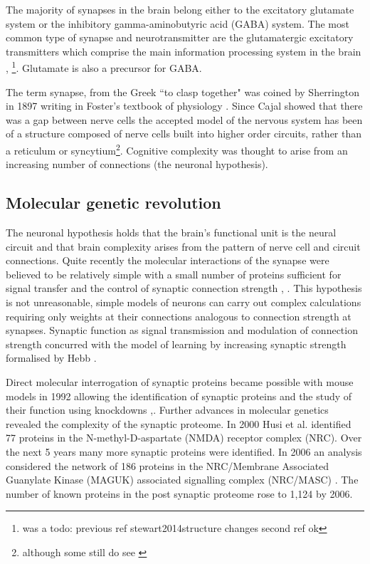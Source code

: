  The majority of synapses in the brain belong either to the excitatory glutamate system or the inhibitory gamma-aminobutyric acid (GABA) system. The most common type of synapse and neurotransmitter are the glutamatergic excitatory transmitters which comprise the main information processing system in the brain \cite{stewart2014structure},\cite{niciu2012overview} \footnote{was a todo: previous ref stewart2014structure changes second ref ok}. Glutamate is also a precursor for GABA. 

The term synapse, from the Greek ``to clasp together" was coined by Sherrington in 1897 writing in Foster’s textbook of physiology \cite{foster1895text}. Since Cajal showed that there was a gap between nerve cells the accepted model of the nervous system has been of a structure composed of nerve cells built into higher order circuits\cite{ramon1911histologie},\cite{grant2018synapse} rather than a reticulum or syncytium\footnote{although some still do see \cite{bacsar2016clair}}. Cognitive complexity was thought to arise from an increasing number of connections (the neuronal hypothesis)\cite{grant2018synaptomic}.
\subsection{Molecular genetic revolution}
\label{sec:molecular genetic revolution}
 The neuronal hypothesis holds that the brain's functional unit is the neural circuit and that brain complexity arises from the pattern of nerve cell and circuit connections\cite{grant2018synaptomic}. Quite recently the molecular interactions of the synapse were believed to be relatively simple with a small number of proteins sufficient for signal transfer and the control of synaptic connection strength \cite{grant2019synapse}, \cite{lisman1994cam}. This hypothesis is not unreasonable, simple models of neurons can carry out complex calculations requiring only weights at their connections analogous to connection strength at synapses\cite{hinton2007learning}. Synaptic function as signal transmission and modulation of connection strength concurred with the model of learning by increasing synaptic strength formalised by Hebb \cite{hebb1949organization_check}.
 
 Direct molecular interrogation of synaptic proteins became possible with mouse models in 1992 allowing the identification of synaptic proteins and the study of their function using knockdowns  \cite{grant1992impaired},\cite{silva1992impaired}. Further advances in molecular genetics revealed the complexity of the synaptic proteome. In 2000 Husi et al. \cite{husi2000proteomic} identified 77 proteins in the N-methyl-D-aspartate (NMDA) receptor complex (NRC). Over the next 5 years many more synaptic proteins were identified. In 2006 an analysis considered the network of 186 proteins in the NRC/Membrane Associated Guanylate Kinase (MAGUK) associated signalling complex (NRC/MASC) \cite{pocklington2006proteomes}. The number of known proteins in the post synaptic proteome rose to 1,124 by 2006\cite{collins2006molecular}.
 
